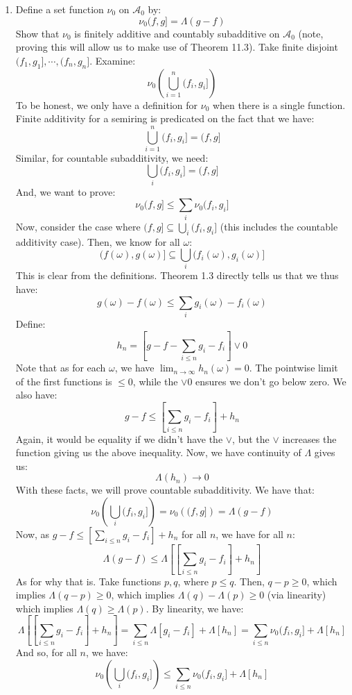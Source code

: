 \documentclass[12pt,a4paper]{article}
\newcommand{\1}[1]{\mathbbm{1}\left\{ #1 \right\}}
\newcommand{\acal}{\mathcal{A}}
\begin{document}
\begin{enumerate}
	\item Define a set function $\nu_0$ on $\acal_0$ by:
	$$
		\nu_0(f,g] = \Lambda(g - f)
	$$
	Show that $\nu_0$ is finitely additive and countably subadditive on $\acal_0$ (note, proving this will allow us to make use of Theorem 11.3). Take finite disjoint $(f_1,g_1], \cdots, (f_n,g_n]$. Examine:
	$$
		\nu_0\left(\bigcup_{i=1}^n (f_i,g_i]\right)
	$$
	To be honest, we only have a definition for $\nu_0$ when there is a single function. Finite additivity for a semiring is predicated on the fact that we have:
	$$
		\bigcup_{i=1}^n (f_i,g_i] = (f,g]
	$$
	Similar, for countable subadditivity, we need:
	$$
		\bigcup_i (f_i,g_i] = (f,g]
	$$
	And, we want to prove:
	$$
		\nu_0(f,g] \leq \sum_i \nu_0(f_i,g_i]
	$$
	Now, consider the case where $(f,g] \subseteq \bigcup_i (f_i,g_i]$ (this includes the countable additivity case). Then, we know for all $\omega$:
	$$
		(f(\omega),g(\omega)] \subseteq \bigcup_i (f_i(\omega), g_i(\omega)]
	$$
	This is clear from the definitions. Theorem 1.3 directly tells us that we thus have:
	$$
		g(\omega) - f(\omega) \leq \sum_i g_i(\omega) - f_i(\omega)
	$$
	Define:
	$$
		h_n = \left[g - f - \sum_{i \leq n} g_i - f_i\right] \vee 0
	$$
	Note that as for each $\omega$, we have $\lim_{n \to \infty} h_n(\omega) = 0$. The pointwise limit of the first functions is $\leq 0$, while the $\vee 0$ ensures we don't go below zero. We also have:
	$$
		g - f \leq \left[\sum_{i \leq n} g_i - f_i\right] + h_n
	$$
	Again, it would be equality if we didn't have the $\vee$, but the $\vee$ increases the function giving us the above inequality. Now, we have continuity of $\Lambda$ gives us:
	$$
		\Lambda(h_n) \to 0
	$$
	With these facts, we will prove countable subadditivity. We have that:
	$$
		\nu_0\left(\bigcup_i (f_i,g_i]\right) =
		\nu_0\left((f,g]\right) = \Lambda(g - f)
	$$
	Now, as $g - f \leq \left[\sum_{i \leq n} g_i - f_i\right] + h_n$ for all $n$, we have for all $n$:
	$$
		\Lambda(g - f) \leq \Lambda\left[\left[\sum_{i \leq n} g_i - f_i\right] + h_n\right]
	$$
	As for why that is. Take functions $p,q$, where $p \leq q$. Then, $q - p \geq 0$, which implies $\Lambda(q - p) \geq 0$, which implies $\Lambda(q) - \Lambda(p) \geq 0$ (via linearity) which implies $\Lambda(q) \geq \Lambda(p)$. By linearity, we have:
	$$
		\Lambda\left[\left[\sum_{i \leq n} g_i - f_i\right] + h_n\right] =
		\sum_{i \leq n}\Lambda\left[g_i - f_i\right] + \Lambda\left[h_n\right] =
		\sum_{i \leq n} \nu_0(f_i,g_i] + \Lambda\left[h_n\right]
	$$
	And so, for all $n$, we have:
	$$
		\nu_0\left(\bigcup_i (f_i,g_i]\right) \leq \sum_{i \leq n} \nu_0(f_i,g_i] + \Lambda\left[h_n\right]
$$
\end{enumerate}
\end{document}

